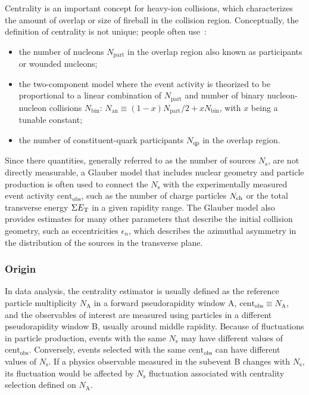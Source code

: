 Centrality is an important concept for heavy-ion collisions, which characterizes the amount of overlap or size of fireball in the collision region. Conceptually, the definition of centrality is not unique; people often use~\cite{Miller:2007ri, Loizides:2014vua, Adler:2013aqf}:
\begin{itemize}
\item the number of nucleons $N_\text{part}$ in the overlap region also known as participants or wounded nucleons;
\item the two-component model where the event activity is theorized to be proportional to a linear combination of $N_\text{part}$ and number of binary nucleon-nucleon collisions $N_\text{bin}$: $N_\text{an}\equiv (1-x)N_\text{part}/2 + x N_\text{bin}$, with $x$ being a tunable constant;
\item the number of constituent-quark participants $N_\text{qp}$ in the overlap region.
\end{itemize}
Since there quantities, generally referred to as the number of sources $N_\text{s}$, are not directly measurable, a Glauber model that includes nuclear geometry and particle production is often used to connect the $N_\text{s}$ with the experimentally measured event activity $\text{cent}_\text{obs}$, such as the number of charge particles $N_\text{ch}$ or the total transverse energy $\Sigma E_\text{T}$ in a given rapidity range. The Glauber model also provides estimates for many other parameters that describe the initial collision geometry, such as eccentricities $\epsilon_n$, which describes the azimuthal asymmetry in the distribution of the sources in the transverse plane.



\subsubsection{Origin}

In data analysis, the centrality estimator is usually defined as the reference particle multiplicity $N_\text{A}$ in a forward pseudorapidity window A, $\text{cent}_\text{obs} \equiv N_\text{A}$, and the observables of interest are measured using particles in a different pseudorapidity window B, usually around middle rapidity. Because of fluctuations in particle production, events with the same $N_\text{s}$ may have different values of $\text{cent}_\text{obs}$. Conversely, events selected with the same $\text{cent}_\text{obs}$ can have different values of $N_\text{s}$. If a physics observable measured in the subevent B changes with $N_\text{s}$, its fluctuation would be affected by $N_\text{s}$ fluctuation associated with centrality selection defined on $N_\text{A}$.

